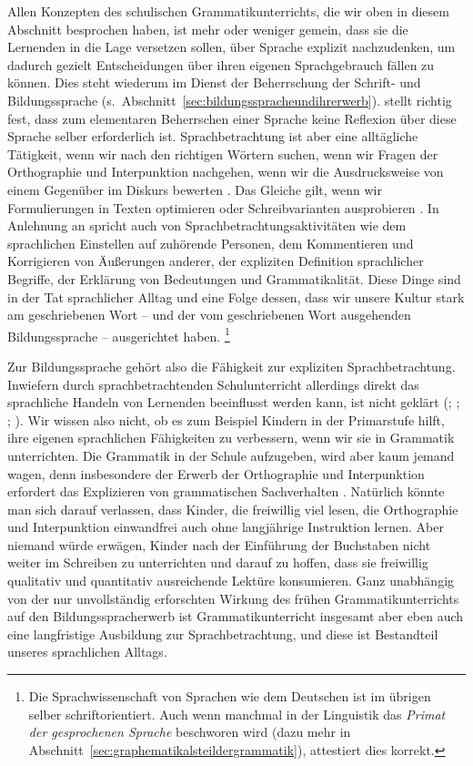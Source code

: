 Allen Konzepten des schulischen Grammatikunterrichts, die wir oben in diesem Abschnitt besprochen haben, ist mehr oder weniger gemein, dass sie die Lernenden in die Lage versetzen sollen, über Sprache explizit nachzudenken, um dadurch gezielt Entscheidungen über ihren eigenen Sprachgebrauch fällen zu können.
Dies steht wiederum im Dienst der Beherrschung der Schrift- und Bildungssprache (s.\ Abschnitt~\ref{sec:bildungsspracheundihrerwerb}).
\citet[14]{Bredel2013} stellt richtig fest, dass zum elementaren Beherrschen einer Sprache keine Reflexion über diese Sprache selber erforderlich ist.
Sprachbetrachtung ist aber eine alltägliche Tätigkeit, \zB wenn wir nach den richtigen Wörtern suchen, wenn wir Fragen der Orthographie und Interpunktion nachgehen, wenn wir die Ausdrucksweise von einem Gegenüber im Diskurs bewerten \citep[22]{Bredel2013}.
Das Gleiche gilt, wenn wir \zB Formulierungen in Texten optimieren oder Schreibvarianten ausprobieren \citep[23]{Bredel2013}.
In Anlehnung an \citet{Clark1978} spricht \citet[35]{Bredel2013} auch von Sprachbetrachtungsaktivitäten wie dem sprachlichen Einstellen auf zuhörende Personen, dem Kommentieren und Korrigieren von Äußerungen anderer, der expliziten Definition sprachlicher Begriffe, der Erklärung von Bedeutungen und Grammatikalität.
Diese Dinge sind in der Tat sprachlicher Alltag und eine Folge dessen, dass wir unsere Kultur stark am geschriebenen Wort -- und der vom geschriebenen Wort ausgehenden Bildungssprache -- ausgerichtet haben.%
\footnote{Die Sprachwissenschaft von Sprachen wie dem Deutschen ist im übrigen selber schriftorientiert.
Auch wenn manchmal in der Linguistik das \textit{Primat der gesprochenen Sprache} beschworen wird (dazu mehr in Abschnitt~\ref{sec:graphematikalsteildergrammatik}), attestiert \citet[40]{Bredel2013} dies korrekt.}

Zur Bildungssprache gehört also die Fähigkeit zur expliziten Sprachbetrachtung.
Inwiefern durch sprachbetrachtenden Schulunterricht allerdings direkt das sprachliche Handeln von Lernenden beeinflusst werden kann, ist nicht geklärt (\citealt[73,75--79,80]{Portmanntselikas2011}; \citealt[94]{Bredel2013}; \citealt[8]{Eisenberg2013c}; \citealt[2]{KoepckeZiegler2013}).
Wir wissen also nicht, ob es zum Beispiel Kindern in der Primarstufe hilft, ihre eigenen sprachlichen Fähigkeiten zu verbessern, wenn wir sie in Grammatik unterrichten.
Die Grammatik in der Schule aufzugeben, wird aber kaum jemand wagen, denn insbesondere der Erwerb der Orthographie und Interpunktion erfordert das Explizieren von grammatischen Sachverhalten \citep[9--10]{Eisenberg2013c}.
Natürlich könnte man sich darauf verlassen, dass Kinder, die freiwillig viel lesen, die Orthographie und Interpunktion einwandfrei auch ohne langjährige Instruktion lernen.
Aber niemand würde erwägen, Kinder nach der Einführung der Buchstaben nicht weiter im Schreiben zu unterrichten und darauf zu hoffen, dass sie freiwillig qualitativ und quantitativ ausreichende Lektüre konsumieren.
Ganz unabhängig von der nur unvollständig erforschten Wirkung des frühen Grammatikunterrichts auf den Bildungsspracherwerb ist Grammatikunterricht insgesamt aber eben auch eine langfristige Ausbildung zur Sprachbetrachtung, und diese ist Bestandteil unseres sprachlichen Alltags.

